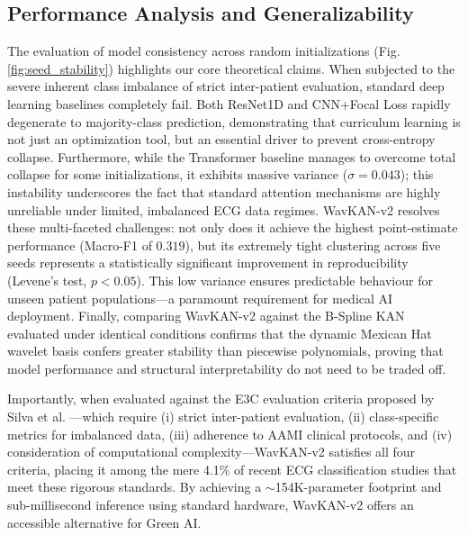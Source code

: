 \documentclass[journal,twoside,web]{ieeecolor}
\begin{document}
\subsection{Performance Analysis and Generalizability}
The evaluation of model consistency across random initializations (Fig. \ref{fig:seed_stability}) highlights our core theoretical claims. When subjected to the severe inherent class imbalance of strict inter-patient evaluation, standard deep learning baselines completely fail. Both ResNet1D and CNN+Focal Loss rapidly degenerate to majority-class prediction, demonstrating that curriculum learning is not just an optimization tool, but an essential driver to prevent cross-entropy collapse. Furthermore, while the Transformer baseline manages to overcome total collapse for some initializations, it exhibits massive variance ($\sigma=0.043$); this instability underscores the fact that standard attention mechanisms are highly unreliable under limited, imbalanced ECG data regimes. WavKAN-v2 resolves these multi-faceted challenges: not only does it achieve the highest point-estimate performance (Macro-F1 of $0.319$), but its extremely tight clustering across five seeds represents a statistically significant improvement in reproducibility (Levene's test, $p < 0.05$). This low variance ensures predictable behaviour for unseen patient populations---a paramount requirement for medical AI deployment. Finally, comparing WavKAN-v2 against the B-Spline KAN evaluated under identical conditions confirms that the dynamic Mexican Hat wavelet basis confers greater stability than piecewise polynomials, proving that model performance and structural interpretability do not need to be traded off.

Importantly, when evaluated against the E3C evaluation criteria proposed by Silva et al. \cite{silva_systematic_2025}---which require (i) strict inter-patient evaluation, (ii) class-specific metrics for imbalanced data, (iii) adherence to AAMI clinical protocols, and (iv) consideration of computational complexity---WavKAN-v2 satisfies all four criteria, placing it among the mere 4.1\% of recent ECG classification studies that meet these rigorous standards. By achieving a $\sim$154K-parameter footprint and sub-millisecond inference using standard hardware, WavKAN-v2 offers an accessible alternative for Green AI.
\end{document}
